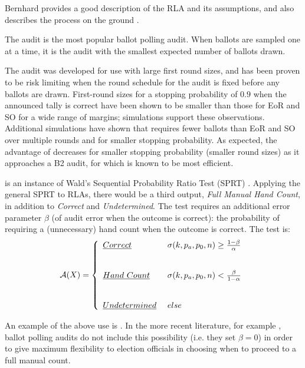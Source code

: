 Bernhard provides a good description of the RLA and its assumptions, and also describes the process on the ground \cite{bernhard-sok}. 

The \BRAVO audit \cite{bravo} is the most popular ballot polling audit. When ballots are sampled one at a time, it is the audit with the smallest expected number of ballots drawn. 

The \Minerva audit \cite{usenix_minerva,arxiv_athena} was developed for use with large first round sizes, and has been proven to be risk limiting when the round schedule for the audit is fixed before any ballots are drawn. First-round sizes for a stopping probability of $0.9$ when the announced tally is correct have been shown to be smaller than those for EoR and SO \BRAVO for a wide range of margins; simulations \cite{arxiv_athena} support these observations. Additional simulations \cite{simulations} have shown that \Minerva requires fewer ballots than EoR and SO \BRAVO over multiple rounds and for smaller stopping probability. As expected, the advantage of \Minerva decreases for smaller stopping probability (smaller round sizes) as it approaches a B2 audit, 
for which \BRAVO is known to be most efficient.

\BRAVO is an instance of Wald's Sequential Probability Ratio Test (SPRT) \cite{wald}. Applying the general SPRT to RLAs, there would be a third output, {\em Full Manual Hand Count}, in addition to {\em Correct} and {\em Undetermined}. The test requires an additional error parameter $\beta$ (of audit error when the outcome is correct): the probability of requiring a (unnecessary) hand count when the outcome is correct. The test is:
\begin{equation}
    \mathcal{A}(X) =  \left\{ \begin{array}{ll} \emph{Correct} & ~\sigma(k, p_a, p_0, n) 
        \geq \frac{1-\beta}{\alpha}\\ \\ \\
       \emph{Hand~Count} & ~\sigma(k, p_a, p_0, n) 
        < \frac{\beta}{1-\alpha}\\ \\ \\
        \emph{Undetermined} & ~else 
    \end{array}
    \right .
    \label{eqn:wald}
\end{equation}

An example of the above use is \cite{RLA}. In the more recent literature, for example \cite{bravo}, ballot polling audits do not include this possibility (i.e. they set $\beta=0$) in order to give maximum flexibility to election officials in choosing when to proceed to a full manual count.

